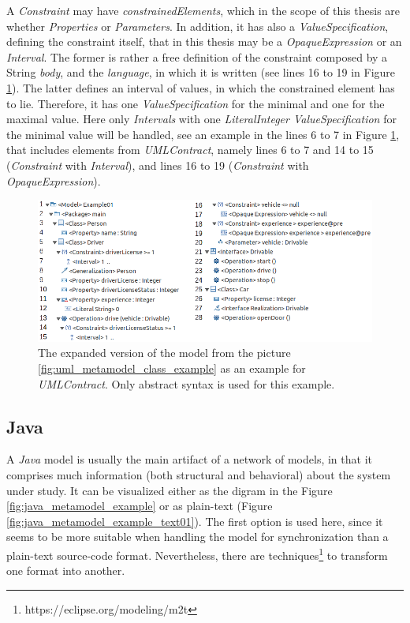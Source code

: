 \documentclass[tuberlin,cic,tc,english,noabntcite]{iiufrgs}
\begin{document}
A \emph{Constraint} may have \emph{constrainedElements}, which in the scope of this thesis are whether \emph{Properties} or \emph{Parameters}. In addition, it has also a \emph{ValueSpecification}, defining the constraint itself, that in this thesis may be a \emph{OpaqueExpression} or an \emph{Interval}. The former is rather a free definition of the constraint composed by a String \emph{body}, and the \emph{language}, in which it is written (see lines 16 to 19 in Figure \ref{fig:uml_metamodel_contracts_example}). The latter defines an interval of values, in which the constrained element has to lie. Therefore, it has one \emph{ValueSpecification} for the minimal and one for the maximal value. Here only \emph{Intervals} with one \emph{LiteralInteger ValueSpecification} for the minimal value will be handled, see an example in the lines 6 to 7 in Figure \ref{fig:uml_metamodel_contracts_example}, that includes elements from \emph{UMLContract}, namely lines 6 to 7 and 14 to 15 (\emph{Constraint} with \emph{Interval}), and lines 16 to 19 (\emph{Constraint} with \emph{OpaqueExpression}).

\begin{figure}[H]
    \caption{The expanded version of the model from the picture \ref{fig:uml_metamodel_class_example} as an example for \emph{UMLContract}. Only abstract syntax is used for this example.}
    \begin{center}
        \includegraphics[width=.8\textwidth]{umlContractDiagramExample01}
    \end{center}
    \label{fig:uml_metamodel_contracts_example}
\end{figure}

\subsection{Java}
A \emph{Java} model is usually the main artifact of a network of models, in that it comprises much information (both structural and behavioral) about the system under study. It can be visualized either as the digram in the Figure \ref{fig:java_metamodel_example} or as plain-text (Figure \ref{fig:java_metamodel_example_text01}). The first option is used here, since it seems to be more suitable when handling the model for synchronization than a plain-text source-code format. Nevertheless, there are techniques\footnote{https://eclipse.org/modeling/m2t} to transform one format into another.
\end{document}
